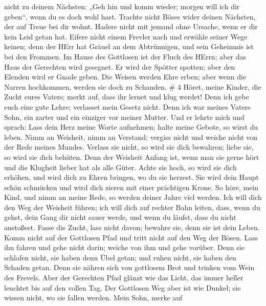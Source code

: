 nicht zu deinem Nächsten: „Geh hin und komm wieder; morgen will ich dir
geben``, wenn du es doch wohl hast.  Trachte nicht Böses
wider deinen Nächsten, der auf Treue bei dir wohnt.  Hadere
nicht mit jemand ohne Ursache, wenn er dir kein Leid getan hat.
 Eifere nicht einem Frevler nach und erwähle seiner Wege
keinen;  denn der HErr hat Gräuel an dem Abtrünnigen, und
sein Geheimnis ist bei den Frommen.  Im Hause des Gottlosen
ist der Fluch des HErrn; aber das Haus der Gerechten wird gesegnet.
 Er wird der Spötter spotten; aber den Elenden wird er
Gnade geben.  Die Weisen werden Ehre erben; aber wenn die
Narren hochkommen, werden sie doch zu Schanden. \# 4  Höret,
meine Kinder, die Zucht eures Vaters; merkt auf, dass ihr lernet und
klug werdet!  Denn ich gebe euch eine gute Lehre; verlasset
mein Gesetz nicht.  Denn ich war meines Vaters Sohn, ein
zarter und ein einziger vor meiner Mutter.  Und er lehrte
mich und sprach: Lass dein Herz meine Worte aufnehmen; halte meine
Gebote, so wirst du leben.  Nimm an Weisheit, nimm an
Verstand; vergiss nicht und weiche nicht von der Rede meines Mundes.
 Verlass sie nicht, so wird sie dich bewahren; liebe sie, so
wird sie dich behüten.  Denn der Weisheit Anfang ist, wenn
man sie gerne hört und die Klugheit lieber hat als alle Güter.
 Achte sie hoch, so wird sie dich erhöhen, und wird dich zu
Ehren bringen, wo du sie herzest.  Sie wird dein Haupt schön
schmücken und wird dich zieren mit einer prächtigen Krone. 
So höre, mein Kind, und nimm an meine Rede, so werden deiner Jahre viel
werden.  Ich will dich den Weg der Weisheit führen; ich
will dich auf rechter Bahn leiten,  dass, wenn du gehst,
dein Gang dir nicht sauer werde, und wenn du läufst, dass du nicht
anstoßest.  Fasse die Zucht, lass nicht davon; bewahre sie,
denn sie ist dein Leben.  Komm nicht auf der Gottlosen Pfad
und tritt nicht auf den Weg der Bösen.  Lass ihn fahren und
gehe nicht darin; weiche von ihm und gehe vorüber.  Denn
sie schlafen nicht, sie haben denn Übel getan; und ruhen nicht, sie
haben den Schaden getan.  Denn sie nähren sich von
gottlosem Brot und trinken vom Wein des Frevels.  Aber der
Gerechten Pfad glänzt wie das Licht, das immer heller leuchtet bis auf
den vollen Tag.  Der Gottlosen Weg aber ist wie Dunkel; sie
wissen nicht, wo sie fallen werden.  Mein Sohn, merke auf
